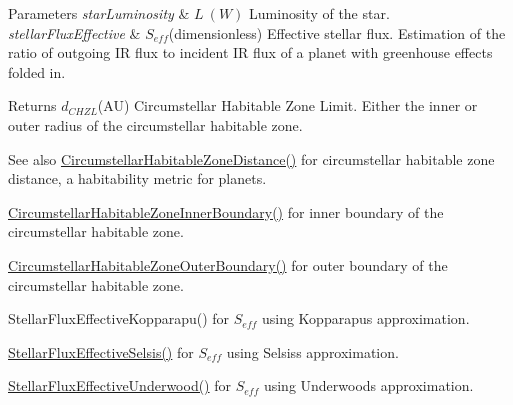 \begin{DoxyParams}{Parameters}
{\em star\+Luminosity} & $L\ (W)$ Luminosity of the star. \\
\hline
{\em stellar\+Flux\+Effective} & $S_{eff}$(dimensionless) Effective stellar flux. Estimation of the ratio of outgoing IR flux to incident IR flux of a planet with greenhouse effects folded in. \\
\hline
\end{DoxyParams}
\begin{DoxyReturn}{Returns}
$d_{CHZL}$(AU) Circumstellar Habitable Zone Limit. Either the inner or outer radius of the circumstellar habitable zone. 
\end{DoxyReturn}
\begin{DoxySeeAlso}{See also}
\mbox{\hyperlink{group___e_g_x_phys-_circumstellar_habitable_zone_limit_gacf3a720793cdb27f6d93b170b44e81be}{Circumstellar\+Habitable\+Zone\+Distance()}} for circumstellar habitable zone distance, a habitability metric for planets. 

\mbox{\hyperlink{group___e_g_x_phys-_circumstellar_habitable_zone_limit_ga9ee2e8023cb444aa4638c962788b5853}{Circumstellar\+Habitable\+Zone\+Inner\+Boundary()}} for inner boundary of the circumstellar habitable zone. 

\mbox{\hyperlink{group___e_g_x_phys-_circumstellar_habitable_zone_limit_gaa47fcde814ba8007de800e930fc0a08d}{Circumstellar\+Habitable\+Zone\+Outer\+Boundary()}} for outer boundary of the circumstellar habitable zone. 

Stellar\+Flux\+Effective\+Kopparapu() for $S_{eff}$ using Kopparapu\textquotesingle{}s approximation. 

\mbox{\hyperlink{group___e_g_x_phys-_circumstellar_habitable_zone_limit_ga3ce3a04fec7b1c8fb66ac54270ce3902}{Stellar\+Flux\+Effective\+Selsis()}} for $S_{eff}$ using Selsis\textquotesingle{}s approximation. 

\mbox{\hyperlink{group___e_g_x_phys-_circumstellar_habitable_zone_limit_ga34d1e39bce17904bc6d383f1935c79d6}{Stellar\+Flux\+Effective\+Underwood()}} for $S_{eff}$ using Underwood\textquotesingle{}s approximation. 
\end{DoxySeeAlso}
\mbox{\label{group___e_g_x_phys-_circumstellar_habitable_zone_limit_gaa47fcde814ba8007de800e930fc0a08d}} 
